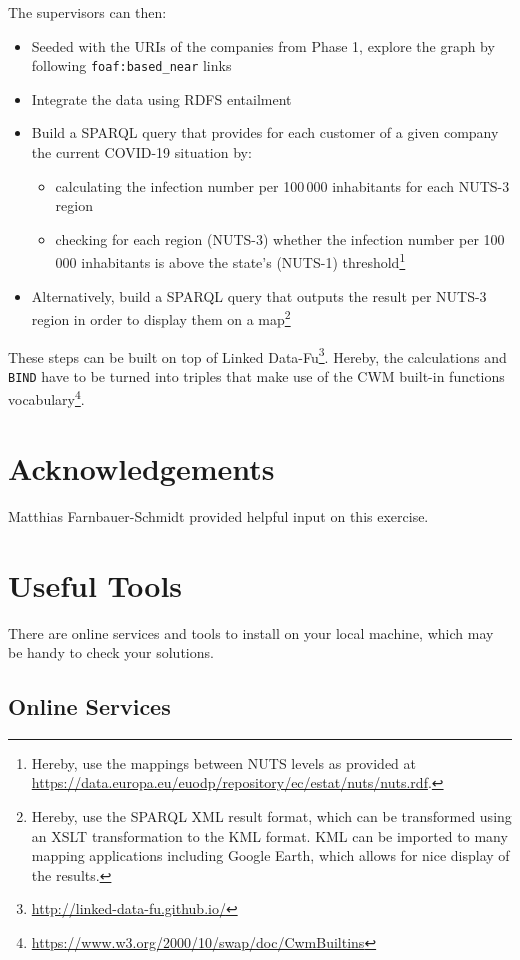 \documentclass[DIV=12]{scrartcl}
\begin{document}
The supervisors can then:
\begin{itemize}
\item Seeded with the URIs of the companies from Phase 1, explore the graph by following \nolinkurl{foaf:based_near} links
\item Integrate the data using RDFS entailment
\item Build a SPARQL query that provides for each customer of a given company the current COVID-19 situation by:
\begin{itemize}
\item calculating the infection number per 100\,000 inhabitants for each NUTS-3 region
\item checking for each region (NUTS-3) whether the infection number per 100\,000 inhabitants is above the state's (NUTS-1) threshold\footnote{Hereby, use the mappings between NUTS levels as provided at \url{https://data.europa.eu/euodp/repository/ec/estat/nuts/nuts.rdf}.}
\end{itemize}
\item Alternatively, build a SPARQL query that outputs the result per NUTS-3 region in order to display them on a map\footnote{Hereby, use the SPARQL XML result format, which can be transformed using an XSLT transformation to the KML format. KML can be imported to many mapping applications including Google Earth, which allows for nice display of the results.}
\end{itemize}
These steps can be built on top of Linked Data-Fu\footnote{\url{http://linked-data-fu.github.io/}}.
Hereby, the calculations and \texttt{BIND} have to be turned into triples that make use of the CWM built-in functions vocabulary\footnote{\url{https://www.w3.org/2000/10/swap/doc/CwmBuiltins}}.

\section*{Acknowledgements}
Matthias Farnbauer-Schmidt provided helpful input on this exercise.

\clearpage
\appendix

\section*{Useful Tools}

There are online services and tools to install on your local machine, which may be handy to check your solutions.

\subsection*{Online Services}
\end{document}
